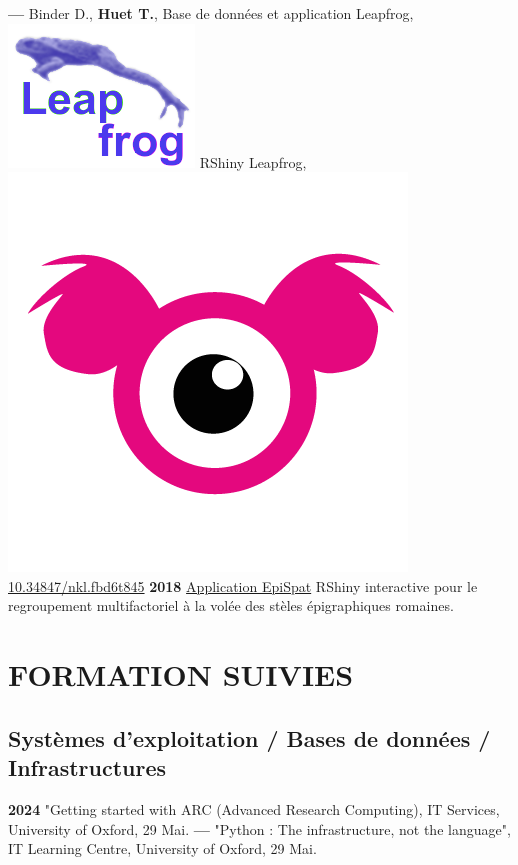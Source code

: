 \documentclass{article}
\begin{document}
\textbf{--- } Binder D., \textbf{Huet T.}, Base de données et application Leapfrog, \href{https://devr.cepam.cnrs.fr/shinyapps/leap/}{\includegraphics[scale=0.10]{prj_leapfrog-blue.png}} \textsf{RShiny} Leapfrog, \href{https://nakala.fr/10.34847/nkl.fbd6t845}{\includegraphics[scale=0.03]{lod-nakala.png} 10.34847/nkl.fbd6t845}
\textbf{2018 }\href{https://epispat.shinyapps.io/analyses_mult_5/}{Application EpiSpat} \textsf{RShiny} interactive pour le regroupement multifactoriel à la volée des stèles épigraphiques romaines.
\smallbreak

\section*{FORMATION SUIVIES}

\subsection*{Systèmes d'exploitation / Bases de données / Infrastructures}

\textbf{2024 }"Getting started with ARC (Advanced Research Computing), IT Services, University of Oxford, 29 Mai.
\smallbreak
\textbf{--- }"\textsf{Python} : The infrastructure, not the language", IT Learning Centre, University of Oxford, 29 Mai.
\smallbreak
\end{document}
